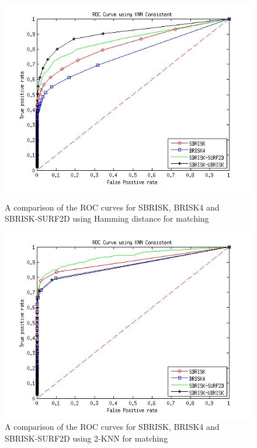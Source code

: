 \documentclass{article}
\begin{document}
\begin{figure}[h!]
\begin{minipage}[b]{0.5\linewidth}
\includegraphics[scale=0.5]{../Drawings/ROC_General_Hamming.jpg}
\caption{A comparison of the ROC curves for SBRISK, BRISK4 and SBRISK-SURF2D using Hamming distance for matching}
\label{fig:compareHamming}
\end{minipage}
\hspace{0.5cm}
\begin{minipage}[b]{0.5\linewidth}
\includegraphics[scale=0.5]{../Drawings/ROC_General_KNN.jpg}
\caption{A comparison of the ROC curves for SBRISK, BRISK4 and SBRISK-SURF2D using 2-KNN for matching}
\label{fig:compareKNN}
\end{minipage}

\end{figure}
\end{document}
